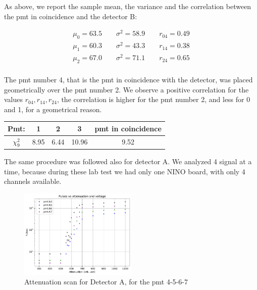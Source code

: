 As above, we report the sample mean, the variance and the correlation between the pmt in coincidence and the detector B:

\begin{equation*}
\begin{split}
\mu_{0} = 63.5 \qquad \sigma^{2} = 58.9 \qquad r_{04} = 0.49 \\
\mu_{1} = 60.3 \qquad \sigma^{2} = 43.3 \qquad r_{14} = 0.38 \\
\mu_{2} = 67.0 \qquad \sigma^{2} = 71.1 \qquad r_{24} = 0.65 \\
\end{split}
\end{equation*}

The pmt number 4, that is the pmt in coincidence with the detector, was placed geometrically over the pmt number 2. 
We observe a positive correlation for the values $r_{04},r_{14},r_{24}$, the correlation is higher for the pmt number 2, and less for 0 and 1, for a geometrical reason. \smallskip

\begingroup
\setlength{\tabcolsep}{8pt} %
\renewcommand{\arraystretch}{1.2} %
\begin{center}
\begin{tabular}{|c|c|c|c|c|}
\hline 
Pmt: & 1 & 2 & 3 & pmt in coincidence \\ 
\hline
$\chi^{2}_{9}$ & 8.95 & 6.44 & 10.96 & 9.52\\ 
\hline
\end{tabular} 
\end{center}
\endgroup
\smallskip


The same procedure was followed also for detector A. We analyzed 4 signal at a time, because during these lab test we had only one NINO board, with only 4 channels available.
\begin{figure}[hbtp]
\centering
\includegraphics[width = 0.5\textwidth]{Analysis/AttenuationA(4-7).pdf}
\caption{Attenuation scan for Detector A, for the pmt 4-5-6-7}
\end{figure}

